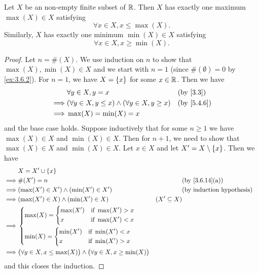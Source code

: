 \begin{ac}\label{ac:5.4.1}
  Let \(X\) be an non-empty finite subset of \(\mathbb{R}\).
  Then \(X\) has exactly one maximum \(\max(X) \in X\) satisfying
  \[
    \forall x \in X, x \leq \max(X).
  \]
  Similarly, \(X\) has exactly one minimum \(\min(X) \in X\) satisfying
  \[
    \forall x \in X, x \geq \min(X).
  \]
\end{ac}

\begin{proof}
  Let \(n = \#(X)\).
  We use induction on \(n\) to show that \(\max(X), \min(X) \in X\) and we start with \(n = 1\) (since \(\#(\emptyset) = 0\) by \cref{ex:3.6.2}).
  For \(n = 1\), we have \(X = \left\lbrace x\right\rbrace\) for some \(x \in \mathbb{R}\).
  Then we have
  \begin{align*}
             & \forall y \in X, y = x                                        &  & \by{3.3}   \\
    \implies & (\forall y \in X, y \leq x) \land (\forall y \in X, y \geq x) &  & \by{5.4.6} \\
    \implies & \max(X) = \min(X) = x
  \end{align*}
  and the base case holds.
  Suppose inductively that for some \(n \geq 1\) we have \(\max(X) \in X\) and \(\min(X) \in X\).
  Then for \(n + 1\), we need to show that \(\max(X) \in X\) and \(\min(X) \in X\).
  Let \(x \in X\) and let \(X' = X \setminus \left\lbrace x\right\rbrace\).
  Then we have
  \begin{align*}
             & X = X' \cup \set{x}                                                                                                           \\
    \implies & \#(X') = n                                                                                &                  & \by{3.6.14}[a] \\
    \implies & (\max(X') \in X') \land (\min(X') \in X')                                                 &                  & \byIH          \\
    \implies & (\max(X') \in X) \land (\min(X') \in X)                                                   & (X' \subseteq X)                  \\
    \implies & \begin{dcases}
                 \max(X) = \begin{dcases}
                  \max(X') & \text{if } \max(X') > x \\
                  x        & \text{if } \max(X') < x
                \end{dcases} \\
                 \min(X) = \begin{dcases}
                  \min(X') & \text{if } \min(X') < x \\
                  x        & \text{if } \min(X') > x
                \end{dcases}
               \end{dcases}                                                                                          \\
    \implies & \big(\forall y \in X, x \leq \max(X)\big) \land \big(\forall y \in X, x \geq \min(X)\big)
  \end{align*}
  and this closes the induction.


\end{proof}
